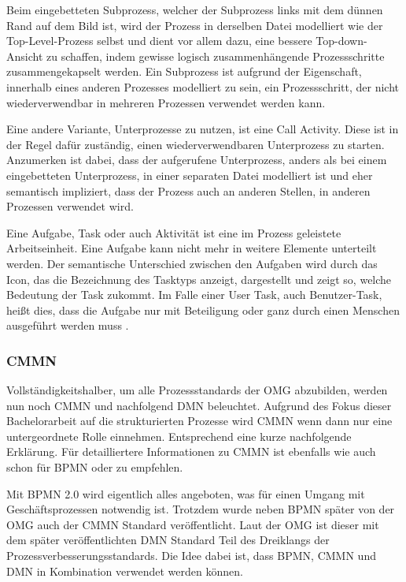 Beim eingebetteten Subprozess, welcher der Subprozess links mit dem dünnen Rand auf dem Bild ist, wird der Prozess in derselben Datei modelliert wie der Top-Level-Prozess selbst und dient vor allem dazu, eine bessere Top-down-Ansicht zu schaffen, indem gewisse logisch zusammenhängende Prozessschritte zusammengekapselt werden. Ein Subprozess ist aufgrund der Eigenschaft, innerhalb eines anderen Prozesses modelliert zu sein, ein Prozessschritt, der nicht wiederverwendbar in mehreren Prozessen verwendet werden kann. \citep[vgl.][S. 35, 37f]{bruce_englisch_2011}

Eine andere Variante, Unterprozesse zu nutzen, ist eine Call Activity. Diese ist in der Regel dafür zuständig, einen wiederverwendbaren Unterprozess zu starten. Anzumerken ist dabei, dass der aufgerufene Unterprozess, anders als bei einem eingebetteten Unterprozess, in einer separaten Datei modelliert ist und eher semantisch impliziert, dass der Prozess auch an anderen Stellen, in anderen Prozessen verwendet wird. \citep[vgl.][S. 38f]{bruce_englisch_2011}

Eine Aufgabe, Task oder auch Aktivität ist eine im Prozess geleistete Arbeitseinheit. Eine Aufgabe kann nicht mehr in weitere Elemente unterteilt werden. Der semantische Unterschied zwischen den Aufgaben wird durch das Icon, das die Bezeichnung des Tasktyps anzeigt, dargestellt und zeigt so, welche Bedeutung der Task zukommt. Im Falle einer User Task, auch Benutzer-Task, heißt dies, dass die Aufgabe nur mit Beteiligung oder ganz durch einen Menschen ausgeführt werden muss \citep[vgl.][S. 39ff]{bruce_bpmn_2012}.

\subsubsection{\acl{CMMN}}

Vollständigkeitshalber, um alle Prozessstandards der \ac{OMG} abzubilden, werden nun noch \ac{CMMN} und nachfolgend \acs{DMN} beleuchtet. Aufgrund des Fokus dieser Bachelorarbeit auf die strukturierten Prozesse wird \ac{CMMN} wenn dann nur eine untergeordnete Rolle einnehmen. Entsprechend eine kurze nachfolgende Erklärung. Für detailliertere Informationen zu \ac{CMMN} ist ebenfalls wie auch schon für \ac{BPMN} \cite{freund_praxishandbuch_2017} oder \cite{bruce_cmmn_2020} zu empfehlen.

\label{par:dreiklang_prozessverbesserungsstandards}
Mit \ac{BPMN} 2.0 wird eigentlich alles angeboten, was für einen Umgang mit Geschäftsprozessen notwendig ist. Trotzdem wurde neben \ac{BPMN} später von der \ac{OMG} auch der \ac{CMMN} Standard veröffentlicht. Laut der \ac{OMG} ist dieser mit dem später veröffentlichten \ac{DMN} Standard Teil des Dreiklangs der Prozessverbesserungsstandards. Die Idee dabei ist, dass \ac{BPMN}, \ac{CMMN} und \ac{DMN} in Kombination verwendet werden können. \citep[vgl.][]{object_management_group_case_2016}

